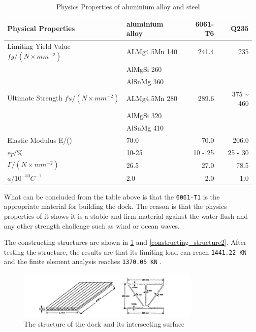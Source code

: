 \documentclass[11pt]{article}
\numberwithin{equation}{section}
\begin{document}
\begin{table}[H]
\caption{\label{Physics_Properties_of_aluminium_alloy_and_steel}Physics Properties of aluminium alloy and steel \cite{10.2749/101686606778995119}}
\centering
\begin{tabular}{llrr}
\toprule
Physical Properties & aluminium alloy & 6061-T6 & Q235\\
\midrule
Limiting Yield Value \(fy /(N\times mm^{-2} )\) & ALMg4.5Mn 140 & 241.4 & 235\\
 & AlMgSi 260 &  & \\
 & AlSnMg 360 &  & \\
\midrule
Ultimate Strength \(fu/(N\times mm^{-2} )\) & ALMg4.5Mn 280 & 289.6 & 375 \textasciitilde{} 460\\
 & AlMgSi 320 &  & \\
 & AlSnMg 410 &  & \\
\midrule
Elastic Modulus E/() & 70.0 & 70.0 & 206.0\\
\(\epsilon_T/\%\) & 10-25 & 10 - 25 & 25 - 30\\
\(\Gamma /(N\times mm^{-2})\) & 26.5 & 27.0 & 78.5\\
\(a/10^{-50}C^{-1}\) & 2.0 & 2.0 & 1.0\\
\bottomrule
\end{tabular}
\end{table}


What can be concluded from the table above is that the \texttt{6061-T1} is the appropriate material for building the dock. The reason is that the physics properties of it shows it is a stable and firm material against the water flush and any other strength challenge such as wind or ocean waves.

The constructing structures are shown in \ref{constructing_structure1} and \ref{constructing_structure2}. After testing the structure, the results are that its limiting load can reach \texttt{1441.22 KN} and the finite element analysis reaches \texttt{1370.05 KN} \cite{10.1061/(ASCE)0887-3828(2001)15:2(68)}.

\begin{figure}[H]
\centering
\includegraphics[width=0.8\textwidth]{Figures/constructing_structure1.jpg}
\caption{\label{constructing_structure1}The structure of the dock and its intersecting surface}
\end{figure}
\end{document}
